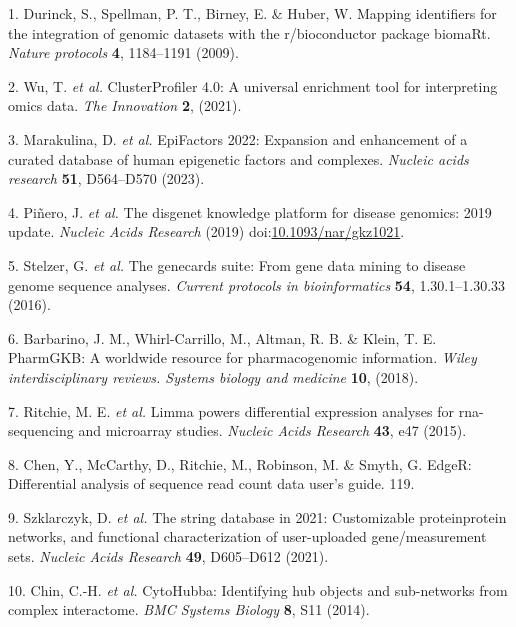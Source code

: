 \documentclass[
]{article}
\newenvironment{cslreferences}%
  {}%
  {\par}
\begin{document}
\hypertarget{refs}{}
\begin{cslreferences}
\leavevmode\hypertarget{ref-MappingIdentifDurinc2009}{}%
1. Durinck, S., Spellman, P. T., Birney, E. \& Huber, W. Mapping identifiers for the integration of genomic datasets with the r/bioconductor package biomaRt. \emph{Nature protocols} \textbf{4}, 1184--1191 (2009).

\leavevmode\hypertarget{ref-ClusterprofilerWuTi2021}{}%
2. Wu, T. \emph{et al.} ClusterProfiler 4.0: A universal enrichment tool for interpreting omics data. \emph{The Innovation} \textbf{2}, (2021).

\leavevmode\hypertarget{ref-Epifactors2022Maraku2023}{}%
3. Marakulina, D. \emph{et al.} EpiFactors 2022: Expansion and enhancement of a curated database of human epigenetic factors and complexes. \emph{Nucleic acids research} \textbf{51}, D564--D570 (2023).

\leavevmode\hypertarget{ref-TheDisgenetKnPinero2019}{}%
4. Piñero, J. \emph{et al.} The disgenet knowledge platform for disease genomics: 2019 update. \emph{Nucleic Acids Research} (2019) doi:\href{https://doi.org/10.1093/nar/gkz1021}{10.1093/nar/gkz1021}.

\leavevmode\hypertarget{ref-TheGenecardsSStelze2016}{}%
5. Stelzer, G. \emph{et al.} The genecards suite: From gene data mining to disease genome sequence analyses. \emph{Current protocols in bioinformatics} \textbf{54}, 1.30.1--1.30.33 (2016).

\leavevmode\hypertarget{ref-PharmgkbAWorBarbar2018}{}%
6. Barbarino, J. M., Whirl-Carrillo, M., Altman, R. B. \& Klein, T. E. PharmGKB: A worldwide resource for pharmacogenomic information. \emph{Wiley interdisciplinary reviews. Systems biology and medicine} \textbf{10}, (2018).

\leavevmode\hypertarget{ref-LimmaPowersDiRitchi2015}{}%
7. Ritchie, M. E. \emph{et al.} Limma powers differential expression analyses for rna-sequencing and microarray studies. \emph{Nucleic Acids Research} \textbf{43}, e47 (2015).

\leavevmode\hypertarget{ref-EdgerDifferenChen}{}%
8. Chen, Y., McCarthy, D., Ritchie, M., Robinson, M. \& Smyth, G. EdgeR: Differential analysis of sequence read count data user's guide. 119.

\leavevmode\hypertarget{ref-TheStringDataSzklar2021}{}%
9. Szklarczyk, D. \emph{et al.} The string database in 2021: Customizable proteinprotein networks, and functional characterization of user-uploaded gene/measurement sets. \emph{Nucleic Acids Research} \textbf{49}, D605--D612 (2021).

\leavevmode\hypertarget{ref-CytohubbaIdenChin2014}{}%
10. Chin, C.-H. \emph{et al.} CytoHubba: Identifying hub objects and sub-networks from complex interactome. \emph{BMC Systems Biology} \textbf{8}, S11 (2014).
\end{cslreferences}
\end{document}
